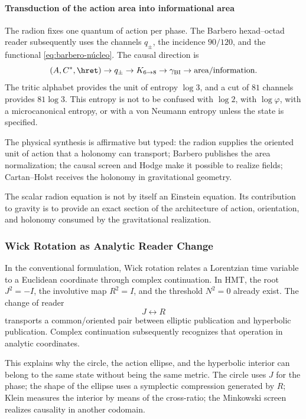 \paragraph{Transduction of the action area into informational area}

The radion fixes one quantum of action per phase. The Barbero hexad--octad
reader subsequently uses the channels \(q_\pm\), the incidence
\(90/120\), and the functional \eqref{eq:barbero-núcleo}. The causal direction is
\[
(A,C^*,\hret)\to q_\pm\to K_{6\to8}
\to\gamma_{\mathrm{BI}}\to\text{area/information}.
\]
The tritic alphabet provides the unit of entropy \(\log3\), and a cut of
\(81\) channels provides \(81\log3\). This entropy is not to be confused with
\(\log2\), with \(\log\varphi\), with a microcanonical entropy, or with a
von Neumann entropy unless the state is specified.

The physical synthesis is affirmative but typed: the radion supplies the oriented unit of action that a holonomy can transport; Barbero publishes the area normalization; the causal screen and Hodge make it possible to realize fields; Cartan--Holst receives the holonomy in gravitational geometry.

\begin{statusbox}
The scalar radion equation is not by itself an Einstein equation. Its
contribution to gravity is to provide an exact section of the architecture of
action, orientation, and holonomy consumed by the gravitational realization.
\end{statusbox}

\subsubsection{Wick Rotation as Analytic Reader Change}

In the conventional formulation, Wick rotation relates a Lorentzian time
variable to a Euclidean coordinate through complex continuation. In HMT,
the root \(J^2=-I\), the involutive map \(R^2=I\), and the threshold
\(N^2=0\) already exist. The change of reader
\[
J\longleftrightarrow R
\]
transports a common/oriented pair between elliptic publication and
hyperbolic publication. Complex continuation subsequently recognizes that
operation in analytic coordinates.

This explains why the circle, the action ellipse, and the hyperbolic interior can
belong to the same state without being the same metric. The circle uses \(J\) for
the phase; the shape of the ellipse uses a symplectic compression generated by \(R\); Klein measures
the interior by means of the cross-ratio; the Minkowski screen realizes causality
in another codomain.
